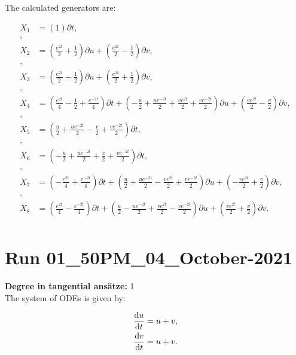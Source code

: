 \noindent The calculated generators are:

\begin{align*}
X_{1}&=\left( 1 \right)\partial t,\\
,\\
X_{2}&=\left( \frac{e^{2 t}}{2} + \frac{1}{2} \right)\partial u+\left( \frac{e^{2 t}}{2} - \frac{1}{2} \right)\partial v,\\
,\\
X_{3}&=\left( \frac{e^{2 t}}{2} - \frac{1}{2} \right)\partial u+\left( \frac{e^{2 t}}{2} + \frac{1}{2} \right)\partial v,\\
,\\
X_{4}&=\left( \frac{e^{2 t}}{4} - \frac{1}{2} + \frac{e^{- 2 t}}{4} \right)\partial t+\left( - \frac{u}{2} + \frac{u e^{- 2 t}}{2} + \frac{v e^{2 t}}{2} + \frac{v e^{- 2 t}}{2} \right)\partial u+\left( \frac{v e^{2 t}}{2} - \frac{v}{2} \right)\partial v,\\
,\\
X_{5}&=\left( \frac{u}{2} + \frac{u e^{- 2 t}}{2} - \frac{v}{2} + \frac{v e^{- 2 t}}{2} \right)\partial t,\\
,\\
X_{6}&=\left( - \frac{u}{2} + \frac{u e^{- 2 t}}{2} + \frac{v}{2} + \frac{v e^{- 2 t}}{2} \right)\partial t,\\
,\\
X_{7}&=\left( - \frac{e^{2 t}}{4} + \frac{e^{- 2 t}}{4} \right)\partial t+\left( \frac{u}{2} + \frac{u e^{- 2 t}}{2} - \frac{v e^{2 t}}{2} + \frac{v e^{- 2 t}}{2} \right)\partial u+\left( - \frac{v e^{2 t}}{2} + \frac{v}{2} \right)\partial v,\\
,\\
X_{8}&=\left( \frac{e^{2 t}}{4} - \frac{e^{- 2 t}}{4} \right)\partial t+\left( \frac{u}{2} - \frac{u e^{- 2 t}}{2} + \frac{v e^{2 t}}{2} - \frac{v e^{- 2 t}}{2} \right)\partial u+\left( \frac{v e^{2 t}}{2} + \frac{v}{2} \right)\partial v.\\
\end{align*}
\section*{Run 01\_50PM\_04\_October-2021}
\textbf{Degree in tangential ansätze:}	1\\
The system of ODEs is given by:

\begin{align*}
\dv{u}{t}&=u + v,\\
\dv{v}{t}&=u + v.\\
\end{align*}

